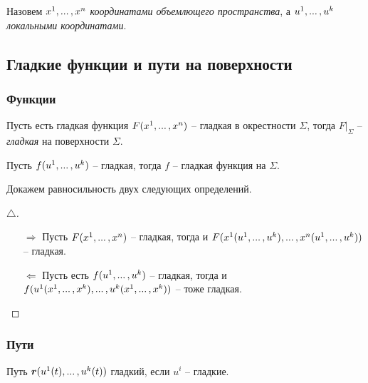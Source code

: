 \begin{to_def} 
    Назовем ${x}^{1}, ... \,, {x}^{n}$ \textit{координатами объемлющего пространства}, а ${u}^{1}, ... \,, {u}^{k}$ \textit{локальными координатами}.
\end{to_def}



\subsection{Гладкие функции и пути на поверхности}


\subsubsection*{Функции}


\begin{to_def} 
     Пусть есть гладкая функция $F({x}^{1}, ... \,, {x}^{n})$ -- гладкая в окрестности $\Sigma$, тогда $F\big|_\Sigma$ -- \textit{гладкая} на поверхности $\Sigma$.
\end{to_def}

\begin{to_def} 
    Пусть  $f({u}^{1}, ... \,, {u}^{k})$ -- гладкая, тогда $f$ -- гладкая функция на $\Sigma$. 
\end{to_def}

Докажем равносильность двух следующих определений. 


\begin{proof}[$\triangle$]
    \begin{minipage}[t]{0.9\textwidth}
        \begin{enumerate}[label = \Roman*.]
            \item[$\Rightarrow$] Пусть $F({x}^{1}, ... \,, {x}^{n})$ -- гладкая, тогда и $F(x^1({u}^{1}, ... \,, {u}^{k}),... \,,x^n({u}^{1}, ... \,, {u}^{k}))$ -- гладкая.
            \item[$\Leftarrow$] Пусть есть $f({u}^{1}, ... \,, {u}^{k})$ -- гладкая, тогда и $f(u^1({x}^{1}, ... \,, {x}^{k}), ... \,, u^k({x}^{1}, ... \,, {x}^{k}))$ -- тоже гладкая. 
        \end{enumerate}
    \end{minipage}

\phantom{42}
\end{proof}

\subsubsection*{Пути}

\begin{to_def} 
     Путь $\mbox{\boldmath $r$}(u^1(t), ... \,, u^k (t))$ гладкий, если $u^i$ -- гладкие.
\end{to_def}

